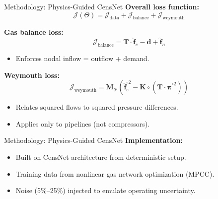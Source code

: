 \documentclass[hyperref={colorlinks,citecolor=blue,linkcolor=blue,urlcolor=blue}]{beamer}
\begin{document}
\begin{frame}{Methodology: Physics-Guided CensNet}
\footnotesize
\textbf{Overall loss function:}
\[
\mathcal{J}(\Theta) =
\mathcal{J}_{\text{data}} +
\mathcal{J}_{\text{balance}} +
\mathcal{J}_{\text{weymouth}}
\]

\textbf{Gas balance loss:}
\[
\mathcal{J}_{\text{balance}} =
\mathbf{T} \cdot \hat{\mathbf{f}}_e - \mathbf{d} + \hat{\mathbf{f}}_n
\]
\begin{itemize}
    \item Enforces nodal inflow = outflow + demand.
\end{itemize}

\textbf{Weymouth loss:}
\[
\mathcal{J}_{\text{weymouth}} =
\mathbf{M}_{\mathcal{P}}
\left( \hat{\mathbf{f}}_e^{\circ 2} -
\mathbf{K} \circ \left(\mathbf{T} \cdot \hat{\boldsymbol{\pi}}^{\circ 2} \right) \right)
\]
\begin{itemize}
    \item Relates squared flows to squared pressure differences.
    \item Applies only to pipelines (not compressors).
\end{itemize}
\end{frame}

\begin{frame}{Methodology: Physics-Guided CensNet}
\textbf{Implementation:}
\begin{itemize}
    \item Built on CensNet architecture from deterministic setup.
    \item Training data from nonlinear gas network optimization (MPCC).
    \item Noise (5\%–25\%) injected to emulate operating uncertainty.
\end{itemize}

\centering
    \resizebox{0.9\linewidth}{!}{}
\end{frame}



\end{document}
